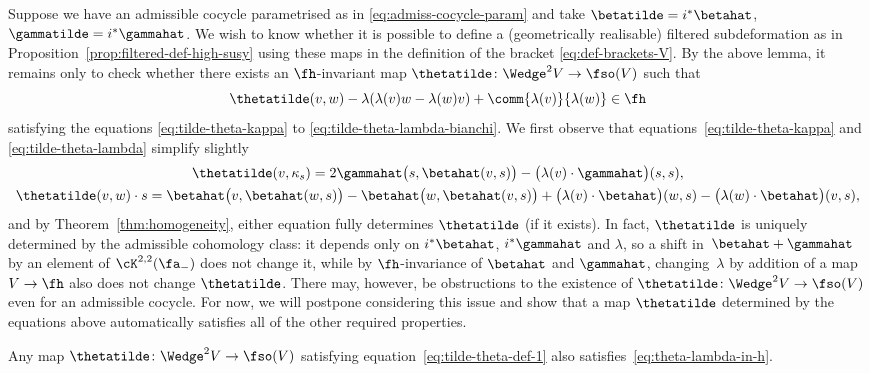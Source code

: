 Suppose we have an admissible cocycle parametrised as in \eqref{eq:admiss-cocycle-param} and take $\betatilde=i^*\betahat$, $\gammatilde=i^*\gammahat$. We wish to know whether it is possible to define a (geometrically realisable) filtered subdeformation as in Proposition~\ref{prop:filtered-def-high-susy} using these maps in the definition of the bracket \eqref{eq:def-brackets-V}. By the above lemma, it remains only to check whether there exists an $\fh$-invariant map $\thetatilde\colon \Wedge^2V\to \fso(V)$ such that
\begin{equation}\label{eq:theta-lambda-in-h}
	\thetatilde(v,w) - \lambda(\lambda(v)w-\lambda(w)v) + \comm{\lambda(v)}{\lambda(w)} \in \fh
\end{equation}
satisfying the equations \eqref{eq:tilde-theta-kappa} to \eqref{eq:tilde-theta-lambda-bianchi}. We first observe that equations~\eqref{eq:tilde-theta-kappa} and \eqref{eq:tilde-theta-lambda} simplify slightly
\begin{gather}
	\thetatilde(v,\kappa_s) = 2\gammahat\bigl(s,\betahat(v,s)\bigr) - \bigl(\lambda(v)\cdot\gammahat\bigr)(s,s),
	\label{eq:tilde-theta-def-1}\\
		\thetatilde(v,w)\cdot s
		= \betahat\bigl(v,\betahat(w,s)\bigr) - \betahat\bigl(w,\betahat(v,s)\bigr) + \bigl(\lambda(v)\cdot\betahat\bigr)(w,s) - \bigl(\lambda(w)\cdot\betahat\bigr)(v,s),
		\label{eq:tilde-theta-act-s}
\end{gather}
and by Theorem~\ref{thm:homogeneity}, either equation fully determines $\thetatilde$ (if it exists). In fact, $\thetatilde$ is uniquely determined by the admissible cohomology class: it depends only on $i^*\betahat$, $i^*\gammahat$ and $\lambda$, so a shift in~${\betahat+\gammahat}$ by an element of $\cK^{2,2}(\fa_-)$ does not change it, while by $\fh$-invariance of $\betahat$ and $\gammahat$, changing~$\lambda$ by addition of a map $V\to\fh$ also does not change $\thetatilde$. There may, however, be obstructions to the existence of $\thetatilde\colon\Wedge^2 V\to \fso(V)$ even for an admissible cocycle. For now, we will postpone considering this issue and show that a map $\thetatilde$ determined by the equations above automatically satisfies all of the other required properties.

\begin{Lemma}\label{lemma:theta-lambda-in-h}
	Any map $\thetatilde\colon\Wedge^2V\to \fso(V)$ satisfying equation~\eqref{eq:tilde-theta-def-1} also satisfies~\eqref{eq:theta-lambda-in-h}.
\end{Lemma}

